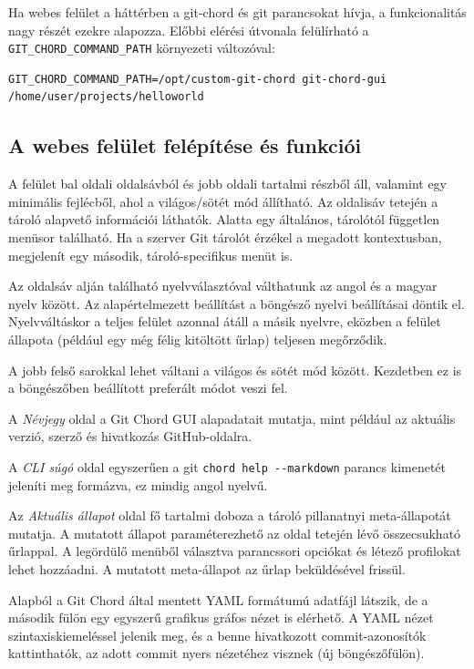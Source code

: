 \documentclass[
]{elteikthesis}[2025/03/25]
\begin{document}
Ha webes felület a háttérben a git-chord és git parancsokat hívja,
a funkcionalitás nagy részét ezekre alapozza.
Előbbi elérési útvonala felülírható a \verb|GIT_CHORD_COMMAND_PATH| környezeti változóval:

\begin{verbatim}
GIT_CHORD_COMMAND_PATH=/opt/custom-git-chord git-chord-gui /home/user/projects/helloworld
\end{verbatim}


\subsection{A webes felület felépítése és funkciói}

A felület bal oldali oldalsávból és jobb oldali tartalmi részből áll,
valamint egy minimális fejlécből, ahol a világos/sötét mód állítható.
Az oldalisáv tetején a tároló alapvető információi láthatók.
Alatta egy általános, tárolótól független menüsor található.
Ha a szerver Git tárolót érzékel a megadott kontextusban,
megjelenít egy második, tároló-specifikus menüt is.

Az oldalsáv alján található nyelvválasztóval válthatunk az angol és a magyar nyelv között.
Az alapértelmezett beállítást a böngésző nyelvi beállításai döntik el.
Nyelvváltáskor a teljes felület azonnal átáll a másik nyelvre,
eközben a felület állapota (például egy még félig kitöltött űrlap) teljesen megőrződik.

A jobb felső sarokkal lehet váltani a világos és sötét mód között.
Kezdetben ez is a böngészőben beállított preferált módot veszi fel.

A \textit{Névjegy} oldal a Git Chord GUI alapadatait mutatja,
mint például az aktuális verzió, szerző és hivatkozás GitHub-oldalra.

A \textit{CLI súgó} oldal egyszerűen a git \verb|chord help --markdown| parancs kimenetét
jeleníti meg formázva, ez mindig angol nyelvű.

Az \textit{Aktuális állapot} oldal fő tartalmi doboza a tároló pillanatnyi meta-állapotát mutatja.
A mutatott állapot paraméterezhető az oldal tetején lévő összecsukható űrlappal.
A legördülő menüből választva parancssori opciókat és létező profilokat lehet hozzáadni.
A mutatott meta-állapot az űrlap beküldésével frissül.

Alapból a Git Chord által mentett YAML formátumú adatfájl látszik,
de a második fülön egy egyszerű grafikus gráfos nézet is elérhető.
A YAML nézet szintaxiskiemeléssel jelenik meg, és a benne hivatkozott commit-azonosítók kattinthatók,
az adott commit nyers nézetéhez visznek (új böngészőfülön).
\end{document}
